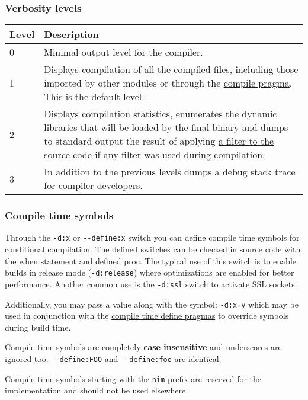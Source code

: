 \hypertarget{verbosity-levels}{%
\subsubsection{Verbosity levels}\label{verbosity-levels}}

\begin{longtable}[]{@{}ll@{}}
\toprule
Level & Description\tabularnewline
\midrule
\endhead
0 & Minimal output level for the compiler.\tabularnewline
1 & Displays compilation of all the compiled files, including those
imported by other modules or through the
\href{manual.html\#implementation-specific-pragmas-compile-pragma}{compile
pragma}. This is the default level.\tabularnewline
2 & Displays compilation statistics, enumerates the dynamic libraries
that will be loaded by the final binary and dumps to standard output the
result of applying \href{filters.html}{a filter to the source code} if
any filter was used during compilation.\tabularnewline
3 & In addition to the previous levels dumps a debug stack trace for
compiler developers.\tabularnewline
\bottomrule
\end{longtable}

\hypertarget{compile-time-symbols}{%
\subsubsection{Compile time symbols}\label{compile-time-symbols}}

Through the \texttt{-d:x} or \texttt{-\/-define:x} switch you can define
compile time symbols for conditional compilation. The defined switches
can be checked in source code with the
\href{manual.html\#statements-and-expressions-when-statement}{when
statement} and \href{system.html\#defined,untyped}{defined proc}. The
typical use of this switch is to enable builds in release mode
(\texttt{-d:release}) where optimizations are enabled for better
performance. Another common use is the \texttt{-d:ssl} switch to
activate SSL sockets.

Additionally, you may pass a value along with the symbol:
\texttt{-d:x=y} which may be used in conjunction with the
\href{manual.html\#implementation-specific-pragmas-compile-time-define-pragmas}{compile
time define pragmas} to override symbols during build time.

Compile time symbols are completely \textbf{case insensitive} and
underscores are ignored too. \texttt{-\/-define:FOO} and
\texttt{-\/-define:foo} are identical.

Compile time symbols starting with the \texttt{nim} prefix are reserved
for the implementation and should not be used elsewhere.

